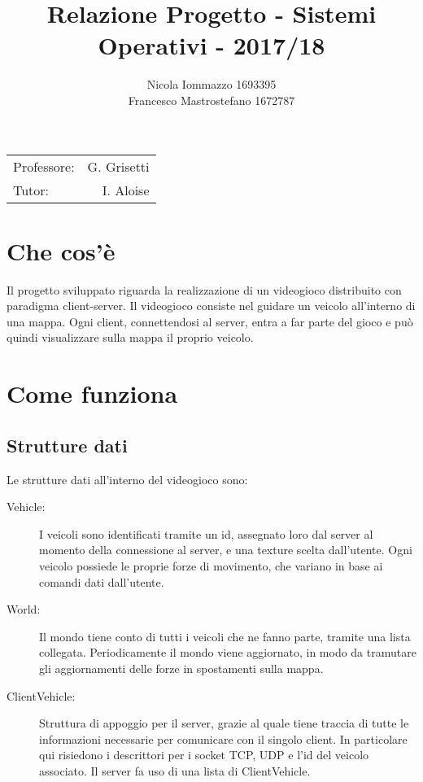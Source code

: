 \documentclass{article}
\title{Relazione Progetto - Sistemi Operativi - 2017/18} %
\author{Nicola Iommazzo 1693395 \\ Francesco Mastrostefano 1672787} %
\date{}
\begin{document}
\maketitle %

\begin{center}
\begin{tabular}{l r}
Professore: & G. Grisetti \\		%
Tutor: & I. Aloise \\			
\end{tabular}
\end{center}

\section*{Che cos'è}
Il progetto sviluppato riguarda la realizzazione di un videogioco distribuito con paradigma client-server.
Il videogioco consiste nel guidare un veicolo all'interno di una mappa. Ogni client, connettendosi al server, entra a far parte del gioco e può quindi visualizzare sulla mappa il proprio veicolo.

\section*{Come funziona}

\subsection*{Strutture dati}
Le strutture dati all'interno del videogioco sono:
\begin{description}
\item[Vehicle:]
I veicoli sono identificati tramite un id, assegnato loro dal server al momento della connessione al server, e una texture scelta dall'utente. Ogni veicolo possiede le proprie forze di movimento, che variano in base ai comandi dati dall'utente. 
\item[World:]
Il mondo tiene conto di tutti i veicoli che ne fanno parte, tramite una lista collegata.
Periodicamente il mondo viene aggiornato, in modo da tramutare gli aggiornamenti delle forze in spostamenti sulla mappa.
\item[ClientVehicle:]
Struttura di appoggio per il server, grazie al quale tiene traccia di tutte le informazioni necessarie per comunicare con il singolo client. In particolare qui risiedono i descrittori per i socket TCP, UDP e l'id del veicolo associato. Il server fa uso di una lista di ClientVehicle.

\end{description}
\end{document}
